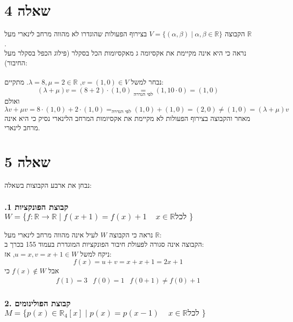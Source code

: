 \documentclass{article}
\newcommand\underrel[2]{\mathrel{\mathop{#2}\limits_{#1}}}
\DeclareMathOperator*{\equals}{=}
\begin{document}
\pagebreak

\section*{שאלה 4}

הקבוצה $V=\{(\alpha, \beta)\;|\; \alpha, \beta \in \mathbb{R}\}$
בצירוף הפעולות שהוגדרו לא מהווה מרחב לינארי מעל $\mathbb{R}$.\\
נראה כי היא אינה מקיימת את אקסיומה ג מאקסיומות הכל בסקלר (פילוג הכפל בסקלר מעל החיבור):
\\\\
נבחר למשל $v=(1,0)\in V$, $\lambda=8, \mu = 2 \in \mathbb{R}$.
מתקיים:
\[
    (\lambda + \mu)v =
    (8+2)\cdot (1,0) \underrel{\text{לפי הגדרה}}{=}
    (1,10\cdot 0) =(1,0)
\]
ואולם
\[
    \lambda v +\mu v =
    8\cdot (1,0) + 2\cdot (1,0) \equals_{\text{לפי הגדרה}}
    (1,0) + (1,0) = (2,0) \ne (1,0) = (\lambda + \mu)v
\]
מאחר והקבוצה בצירוף הפעולות לא מקיימת את אקסיומות המרחב הלינארי נסיק כי היא אינה מרחב לינארי.

\section*{שאלה 5}

נבחן את ארבע הקבוצות בשאלה:

\subsubsection*{.1 קבוצת הפונקציות $W=\{f: \mathbb{R} \rightarrow \mathbb{R} \; | \; f(x+1) = f(x)+1 \;\;\;\; x\in \mathbb{R} \text{לכל } \}$}

נראה כי הקבוצה $W$ לעיל אינה מהווה מרחב לינארי מעל $\mathbb{R}$: \\
הקבוצה אינה סגורה לפעולת חיבור הפונקציות המוגדרת בעמוד 155 בכרך ב: \\
ניקח למשל $u=x, v=x+1\in W$, אז:
\[
    f(x)=u+v=
    x+x+1=
    2x+1
\]
אבל $f(x)\notin W$
כי
\[
    \begin{matrix}
        f(1)=3 & f(0) = 1 & f(0+1)\ne f(0)+1
    \end{matrix}
\]

\subsubsection*{2. קבוצת הפולינומים $M=\{p(x)\in \mathbb{R}_4[x] \; | \; p(x) = p(x-1) \;\;\;\; x\in \mathbb{R} \text{לכל } \}$}
\end{document}
